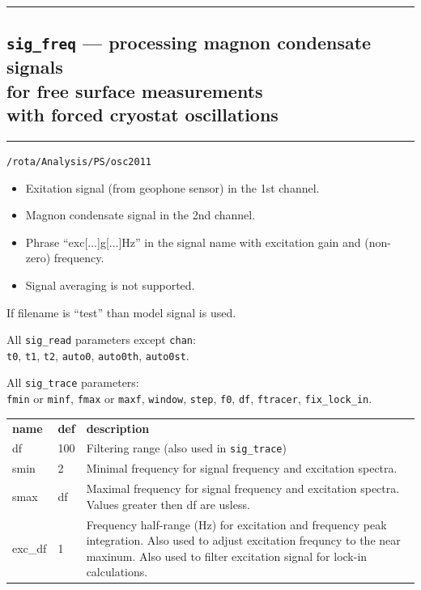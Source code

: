 \documentclass[a4paper]{article}
\begin{document}
\hrule
\subsection*{{\tt sig\_freq} --- processing magnon condensate signals\\
for free surface measurements\\
with forced cryostat oscillations}
\hrule
\bigskip

\medskip{} {\tt /rota/Analysis/PS/osc2011}

\medskip{}
\begin{itemize}
\item Exitation signal (from geophone sensor) in the 1st channel.
\item Magnon condensate signal in the 2nd channel.
\item Phrase ``exc[...]g[...]Hz'' in the signal name with excitation gain and (non-zero) frequency.
\item Signal averaging is not supported.
\end{itemize}

If filename is ``test'' than model signal is used.

\medskip{}

All {\tt sig\_read} parameters except {\tt chan}:\\
{\tt t0}, {\tt t1}, {\tt t2}, {\tt auto0}, {\tt auto0th}, {\tt auto0st}.

All {\tt sig\_trace} parameters:\\
{\tt fmin} or {\tt minf}, {\tt fmax} or {\tt maxf},
{\tt window}, {\tt step}, {\tt f0}, {\tt df}, {\tt ftracer}, {\tt fix\_lock\_in}.

\medskip\noindent
\begin{tabular}{p{3cm}p{1cm}p{13cm}}\hline
\bf name & \bf def & \bf description\\
df      & 100 & Filtering range (also used in {\tt sig\_trace})\\
smin    & 2   & Minimal frequency for signal frequency and excitation spectra.\\
smax    & df  & Maximal frequency for signal frequency and excitation spectra.
                Values greater then df are usless.\\
exc\_df & 1   & Frequency half-range (Hz) for excitation and frequency peak integration.
                Also used to adjust excitation frequncy to the near maxinum.
                Also used to filter excitation signal for lock-in calculations.\\
\hline
\end{tabular}
\medskip
\end{document}
